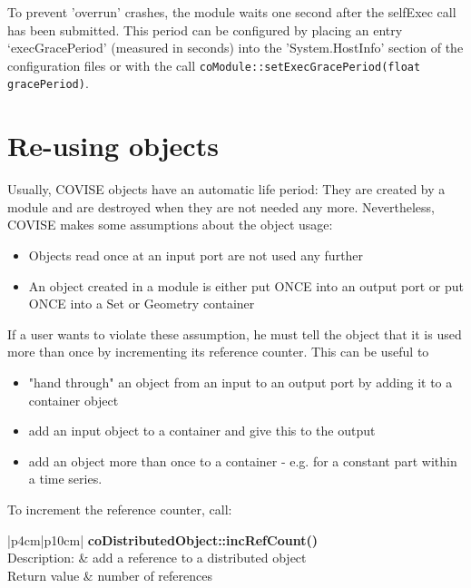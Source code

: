 To prevent 'overrun' crashes, the module waits one second after the selfExec 
call has been submitted. This period can be configured by placing an
entry `execGracePeriod' (measured in seconds) into the 'System.HostInfo' section of the configuration files or 
with the call {\tt coModule::setExecGracePeriod(float gracePeriod)}.


\section{Re-using objects}

Usually, COVISE objects have an automatic life period: They are created by a 
module and are destroyed when they are not needed any more. Nevertheless,
COVISE makes some assumptions about the object usage:

\begin{itemize}
\item Objects read once at an input port are not used any further
\item An object created in a module is either put ONCE into an output port 
or put ONCE  into a Set or Geometry container
\end{itemize}

If a user wants to violate these assumption, he must tell the object that it 
is used more than once by incrementing its reference counter. This can be
useful to

\begin{itemize}
\item "hand through" an object from an input to an output port by adding it to a container object
\item add an input object to a container and give this to the output
\item add an object more than once to a container - e.g. for a constant part 
within a time series.
\end{itemize}

To increment the reference counter, call:


\begin{longtable}{|p{4cm}|p{10cm}|}
\hline
{}
{\bf coDistributedObject::incRefCount()}\\
\hline
{Description:}  
           & {add a reference to a distributed object} \\
\hline
{Return value}  
              & {number of references} \\
\hline
\end{longtable}

